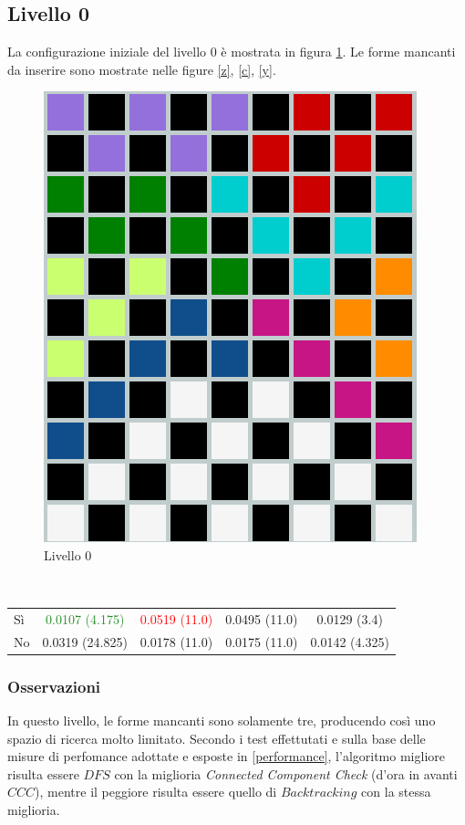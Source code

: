 \subsection{Livello 0}
La configurazione iniziale del livello 0 è mostrata in figura \ref{lev0}. Le forme mancanti da inserire sono mostrate nelle figure \ref{z}, \ref{c}, \ref{y}.
\begin{figure}[h]
	\centering
	\includegraphics[scale=0.3]{immagini/lv0}
	\caption{Livello 0}
	\label{lev0}
\end{figure}
\\
\noindent

\begin{table} 
	\begin{tabular}{|l||*{4}{c|}}\hline 
		\backslashbox{Miglioria}{Solver} 
		&\makebox{DFS}&\makebox{Backtracking}&\makebox{Recursive Backtracking}	&\makebox{MinConflicts}\\ \hline 
		Sì&\textcolor{ForestGreen}{0.0107 (4.175)}&\textcolor{red}{0.0519 (11.0)}&0.0495 (11.0)&0.0129 (3.4) \\ \hline 
		No&0.0319 (24.825)&0.0178 (11.0)&0.0175 (11.0)&0.0142 (4.325)  \\ \hline 
	\end{tabular} 
\end{table}

\subsubsection{Osservazioni}
In questo livello, le forme mancanti sono solamente tre, producendo così uno spazio di ricerca molto limitato. Secondo i test effettutati e sulla base delle misure di perfomance adottate e esposte in \ref{performance}, l'algoritmo migliore risulta essere $DFS$ con la miglioria \textit{Connected Component Check} (d'ora in avanti $CCC$), mentre il peggiore risulta essere quello di $Backtracking$ con la stessa miglioria.\\

